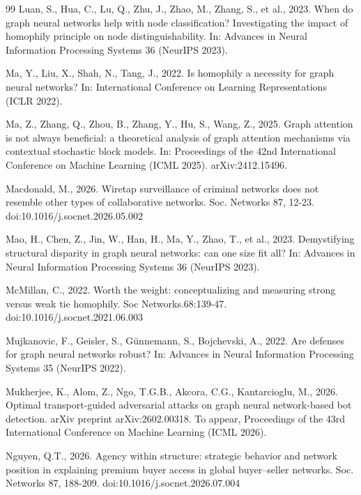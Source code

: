 \documentclass[onecolumn,pdflatex,sn-basic,Numbered]{sn-jnl}
\theoremstyle{thmstyleone}
\theoremstyle{thmstylethree}
\begin{document}
\begin{thebibliography}{99}
Luan, S., Hua, C., Lu, Q., Zhu, J., Zhao, M., Zhang, S., et al., 2023. When do graph neural networks help with node classification? Investigating the impact of homophily principle on node distinguishability. In: Advances in Neural Information Processing Systems 36 (NeurIPS 2023).

Ma, Y., Liu, X., Shah, N., Tang, J., 2022. Is homophily a necessity for graph neural networks? In: International Conference on Learning Representations (ICLR 2022).

Ma, Z., Zhang, Q., Zhou, B., Zhang, Y., Hu, S., Wang, Z., 2025. Graph attention is not always beneficial: a theoretical analysis of graph attention mechanisms via contextual stochastic block models. In: Proceedings of the 42nd International Conference on Machine Learning (ICML 2025). arXiv:2412.15496.

Macdonald, M., 2026. Wiretap surveillance of criminal networks does not resemble other types of collaborative networks. Soc. Networks 87, 12-23. doi:10.1016/j.socnet.2026.05.002

Mao, H., Chen, Z., Jin, W., Han, H., Ma, Y., Zhao, T., et al., 2023. Demystifying structural disparity in graph neural networks: can one size fit all? In: Advances in Neural Information Processing Systems 36 (NeurIPS 2023).

McMillan, C., 2022. Worth the weight: conceptualizing and measuring strong versus weak tie homophily. Soc Networks.68:139-47. doi:10.1016/j.socnet.2021.06.003

Mujkanovic, F., Geisler, S., G\"unnemann, S., Bojchevski, A., 2022. Are defenses for graph neural networks robust? In: Advances in Neural Information Processing Systems 35 (NeurIPS 2022).

Mukherjee, K., Alom, Z., Ngo, T.G.B., Akcora, C.G., Kantarcioglu, M., 2026. Optimal transport-guided adversarial attacks on graph neural network-based bot detection. arXiv preprint arXiv:2602.00318. To appear, Proceedings of the 43rd International Conference on Machine Learning (ICML 2026).

Nguyen, Q.T., 2026. Agency within structure: strategic behavior and network position in explaining premium buyer access in global buyer--seller networks. Soc. Networks 87, 188-209. doi:10.1016/j.socnet.2026.07.004


\end{thebibliography}
\end{document}
